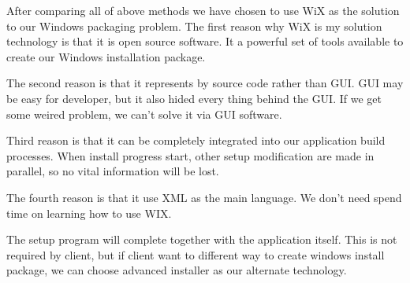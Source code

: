 After comparing all of above methods we have chosen to use WiX as the solution to our Windows packaging problem.
The first reason why WiX is my solution technology is that it is open source software.
It a powerful set of tools available to create our Windows installation package.

The second reason is that it represents by source code rather than GUI.
GUI may be easy for developer, but it also hided every thing behind the GUI.
If we get some weired problem, we can't solve it via GUI software.

Third reason is that it can be completely integrated into our application build processes.
When install progress start, other setup modification are made in parallel, so no vital information will be lost.

The fourth reason is that it use XML as the main language.
We don't need spend time on learning how to use WIX.

The setup program will complete together with the application itself.
This is not required by client, but if client want to different way to create windows install package, we can choose advanced installer as our alternate technology.
